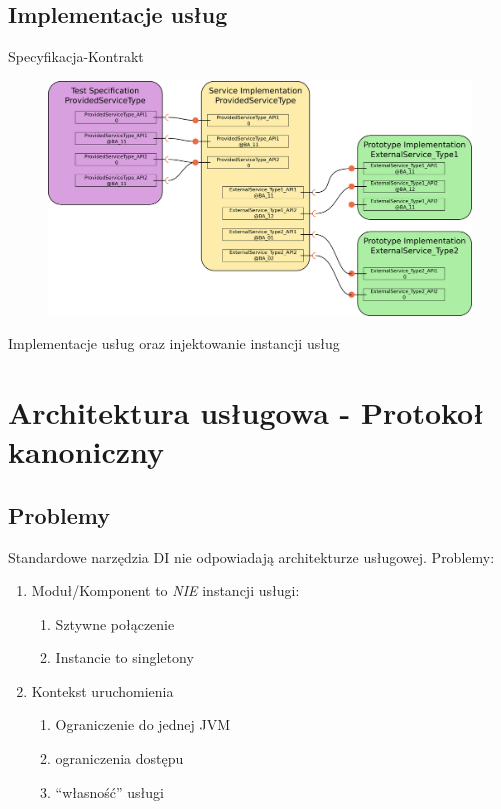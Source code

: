 \documentclass[smaller]{beamer}
\begin{document}
\subsection{Implementacje usług}
\begin{frame}{Specyfikacja-Kontrakt}
\begin{figure}
 \centering
 \includegraphics[width=1\textwidth]{servicePicture}
 \label{fig:serviceImplementation}
\end{figure}
Implementacje usług oraz injektowanie instancji usług
\end{frame}


\section{Architektura usługowa - Protokoł kanoniczny}
\subsection{Problemy}
\begin{frame}
Standardowe narzędzia DI nie odpowiadają architekturze usługowej. Problemy:
\pause
 \begin{enumerate}
  \item<2-> Moduł/Komponent to \emph{NIE} instancji usługi:
  \begin{enumerate}
   \item Sztywne połączenie
   \item Instancie to singletony
  \end{enumerate}
  \item<3-> Kontekst uruchomienia
  \begin{enumerate}
   \item Ograniczenie do jednej JVM
   \item ograniczenia dostępu
   \item ``własność'' usługi
  \end{enumerate}
 \end{enumerate}
\end{frame}
\end{document}
